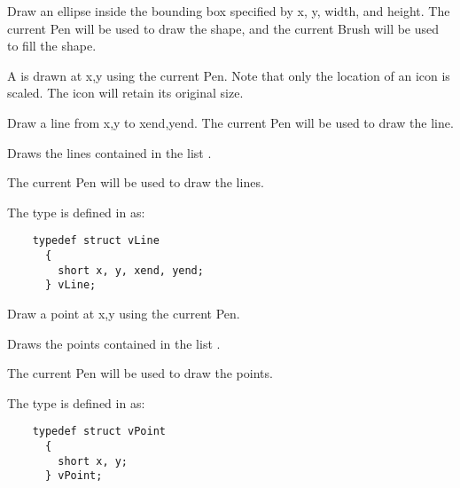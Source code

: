 
Draw an ellipse inside the bounding box specified by x, y, width,
and height.
The current Pen will be used to draw the shape, and the current
Brush will be used to fill the shape.


A  is drawn at x,y using the current Pen.
Note that only the location of an icon is scaled. The icon
will retain its original size.


Draw a line from x,y to xend,yend.
The current Pen will be used to draw the line.


Draws the  lines contained in the list .

The current Pen will be used to draw the lines.

The type  is defined in  as:
\footnotesize
\begin{verbatim}
    typedef struct vLine
      {
        short x, y, xend, yend;
      } vLine;
\end{verbatim}
\normalfont\normalsize



Draw a point at x,y using the current Pen.


Draws the  points contained in the list .

The current Pen will be used to draw the points.

The type  is defined in  as:
\footnotesize
\begin{verbatim}
    typedef struct vPoint
      {
        short x, y;
      } vPoint;
\end{verbatim}
\normalfont\normalsize

